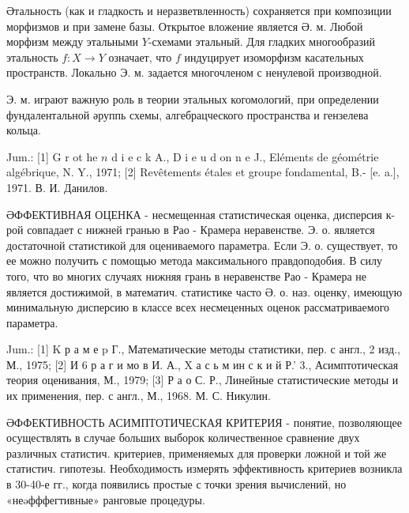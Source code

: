 \documentclass[10pt]{article}
\begin{document}
Әтальность (как и гладкость и неразветвленность) сохраняется при композиции морфизмов и при замене базы. Открытое вложение является Ә. м. Любой морфизм между этальными $Y$-схемами этальный. Для гладких многообразий этальность $f: X \rightarrow Y$ означает, что $f$ индуцирует изоморфизм касательных пространств. Локально Э. м. задается многочленом с ненулевой производной.



Э. м. играют важную роль в теории этальных когомологий, при определении фундалентальной әруппь схемы, алгебрацческого пространства и гензелева кольца.



Jum.: [1] G r ot he $n$ d i e c k A., D i e u d on n e J., Eléments de géométrie algébrique, N. Y., 1971; [2] Revêtements étales et groupe fondamental, B.- [e. a.], 1971. В. И. Данилов.



ӘФФЕКТИВНАЯ ОЦЕНКА - несмещенная статистическая оценка, дисперсия к-рой совпадает с нижней гранью в Рао - Крамера неравенстве. Э. о. является достаточной статистикой для оцениваемого параметра. Если Э. о. существует, то ее можно получить с помощью метода максимального правдоподобия. В силу того, что во многих случаях нижняя грань в неравенстве Рао - Крамера не является достижимой, в математич. статистике часто Ә. о. наз. оценку, имеющую минимальную дисперсию в классе всех несмеценных оценок рассматриваемого параметра.



Jum.: [1] K р а м е p Г., Математические методы статистики, пер. с англ., 2 изд., М., 1975; [2] И 6 р а г и мо в И. А., X а с ь м ин с к и й Р.' 3., Асимптотическая теория оценивания, М., 1979; [3] Р а о С. Р., Линейные статистические методы и их применения, пер. с англ., М., 1968. М. С. Никулин.



ӘФФЕКТИВНОСТЬ АСИМПТОТИЧЕСКАЯ КРИТЕРИЯ - понятие, позволяющее осуществлять в случае больших выборок количественное сравнение двух различных статистич. критериев, применяемых для проверки ложной и той же статистич. гипотезы. Необходимость измерять эффективность критериев возникла в 30-40-е гг., когда появились простые с точки зрения вычислений, но «неəфффегтивные» ранговые процедуры.
\end{document}
